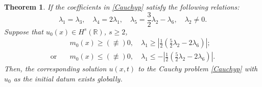 \documentclass[11pt]{article}
\newtheorem{theorem}{Theorem}
\begin{document}
\begin{theorem}\label{GE1}
If the coefficients in \eqref{Cauchyp} satisfy the following relations:
\begin{equation}\label{constraintsforGE1}
\lambda_1=\lambda_3,\quad\lambda_4 =2\lambda_1,\quad \lambda_5 = \frac32\lambda_2 - \lambda_6,\quad \lambda_2\neq0.
\end{equation}
Suppose that $u_0(x)\in H^s(\mathbb{R})$, $s\geq 2$, 
\begin{eqnarray}
&m_0(x)\geq(\not\equiv) 0,\quad \lambda_1\geq\left|\frac{1}{2}\left(\frac{5}{2}\lambda_2-2\lambda_6\right)\right|;\label{constraints2forGE1}\\
\mathrm{or}\quad &m_0(x)\leq(\not\equiv) 0,\quad \lambda_1\leq-\left|\frac{1}{2}\left(\frac{5}{2}\lambda_2-2\lambda_6\right)\right|. \label{constraints2forGE2}
\end{eqnarray}
Then, the corresponding solution $u(x, t)$ to
the Cauchy problem \eqref{Cauchyp} with $u_0$ as the initial datum exists globally.
\end{theorem}
\end{document}
